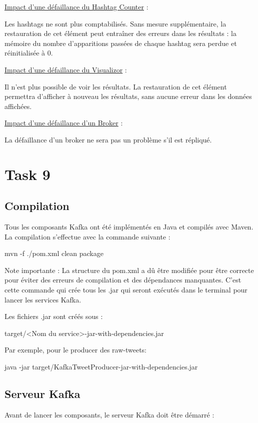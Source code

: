 \documentclass[10pt,a4paper]{article}
\begin{document}
\underline{Impact d'une défaillance du Hashtag Counter} :

Les hashtags ne sont plus comptabilisés. Sans mesure supplémentaire, la restauration de cet élément peut entraîner des erreurs dans les résultats : la mémoire du nombre d'apparitions passées de chaque hashtag sera perdue et réinitialisée à $0$.

\underline{Impact d'une défaillance du Visualizor} :

Il n'est plus possible de voir les résultats. La restauration de cet élément permettra d'afficher à nouveau les résultats, sans aucune erreur dans les données affichées.

\underline{Impact d'une défaillance d'un Broker} :

La défaillance d'un broker ne sera pas un problème s'il est répliqué.



\section{Task 9}

\subsection{Compilation}

Tous les composants Kafka ont été implémentés en Java et compilés avec Maven. La compilation s'effectue avec la commande suivante :

mvn -f ./pom.xml clean package

Note importante : La structure du pom.xml a dû être modifiée pour être correcte pour éviter des erreurs de compilation et des dépendances manquantes. C'est cette commande qui crée tous les .jar qui seront exécutés dans le terminal pour lancer les services Kafka. 

Les fichiers .jar sont créés sous :

target/<Nom du service>-jar-with-dependencies.jar

Par exemple, pour le producer des raw-tweets:

java -jar target/KafkaTweetProducer-jar-with-dependencies.jar

\subsection{Serveur Kafka}

Avant de lancer les composants, le serveur Kafka doit être démarré :
\end{document}
